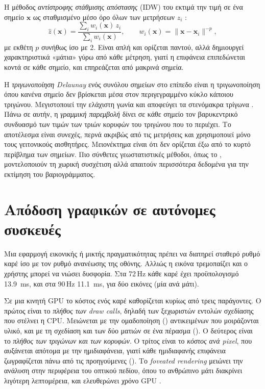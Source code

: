 Η μέθοδος \emph{αντίστροφης στάθμισης απόστασης} (IDW) του  εκτιμά την τιμή σε ένα σημείο $\mathbf{x}$ ως σταθμισμένο μέσο όρο όλων των μετρήσεων $z_i$ \cite{shepard1968interpolation}:
\begin{equation}
  \hat{z}(\mathbf{x}) = \frac{\sum_i w_i(\mathbf{x})\, z_i}{\sum_i w_i(\mathbf{x})}, \qquad
  w_i(\mathbf{x}) = \lVert \mathbf{x} - \mathbf{x}_i \rVert^{-p},
  \label{eq:idw}
\end{equation}
με εκθέτη $p$ συνήθως ίσο με 2. Είναι απλή και ορίζεται παντού, αλλά δημιουργεί χαρακτηριστικά «μάτια» γύρω από κάθε μέτρηση, γιατί η επιφάνεια επιπεδώνεται κοντά σε κάθε σημείο, και επηρεάζεται από μακρινά σημεία.

Η \emph{τριγωνοποίηση Delaunay} ενός συνόλου σημείων στο επίπεδο είναι η τριγωνοποίηση όπου κανένα σημείο δεν βρίσκεται μέσα στον περιγεγραμμένο κύκλο κάποιου τριγώνου. Μεγιστοποιεί την ελάχιστη γωνία και αποφεύγει τα στενόμακρα τρίγωνα \cite{deberg2008computational}. Πάνω σε αυτήν, η \emph{γραμμική παρεμβολή} δίνει σε κάθε σημείο τον βαρυκεντρικό συνδυασμό των τιμών των τριών κορυφών του τριγώνου που το περιέχει. Το αποτέλεσμα είναι συνεχές, περνά ακριβώς από τις μετρήσεις και χρησιμοποιεί μόνο τους γειτονικούς αισθητήρες. Μειονέκτημα είναι ότι δεν ορίζεται έξω από το κυρτό περίβλημα των σημείων. Πιο σύνθετες γεωστατιστικές μέθοδοι, όπως το , μοντελοποιούν τη χωρική συσχέτιση αλλά απαιτούν περισσότερα δεδομένα για την εκτίμηση του βαριογράμματος.

\section{Απόδοση γραφικών σε αυτόνομες συσκευές}
\label{sec:bg-rendering}

Μια εφαρμογή εικονικής ή μικτής πραγματικότητας πρέπει να διατηρεί σταθερό ρυθμό καρέ ίσο με τον ρυθμό ανανέωσης της οθόνης. Αλλιώς η εικόνα τρεμοπαίζει και ο χρήστης μπορεί να νιώσει δυσφορία. Στα 72\,Hz κάθε καρέ έχει προϋπολογισμό \SI{13.9}{ms}, και στα 90\,Hz \SI{11.1}{ms}, για δύο εικόνες (μία ανά μάτι).

Σε μια κινητή GPU το κόστος ενός καρέ καθορίζεται κυρίως από τρεις παράγοντες. Ο πρώτος είναι το \emph{πλήθος των draw calls}, δηλαδή των ξεχωριστών εντολών σχεδίασης που στέλνει η CPU. Μειώνεται με την ομαδοποίηση () αντικειμένων που μοιράζονται υλικό, και με τη σχεδίαση και των δύο ματιών σε ένα πέρασμα (). Ο δεύτερος είναι το \emph{πλήθος των τριγώνων και των κορυφών}. Ο τρίτος είναι το \emph{κόστος ανά pixel}, που αυξάνεται απότομα με την ημιδιαφάνεια, γιατί κάθε ημιδιαφανής επιφάνεια ζωγραφίζεται πάνω από τις προηγούμενες (). Το \emph{foveated rendering} μειώνει την ανάλυση στην περιφέρεια του οπτικού πεδίου, όπου το ανθρώπινο μάτι διακρίνει λιγότερη λεπτομέρεια, και ελευθερώνει χρόνο GPU \cite{patney2016foveated}.

